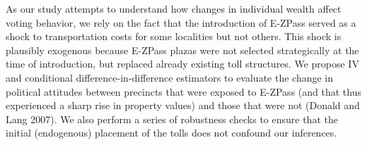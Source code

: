 As our study attempts to understand how changes in individual wealth affect voting behavior, we rely on the fact that the introduction of E-ZPass served as a shock to transportation costs for some localities but not others. This shock is plausibly exogenous because E-ZPass plazas were not selected strategically at the time of introduction, but replaced already existing toll structures. We propose IV and conditional difference-in-difference estimators to evaluate the change in political attitudes between precincts that were exposed to E-ZPass (and that thus experienced a sharp rise in property values) and those that were not (Donald and Lang 2007). We also perform a series of robustness checks to ensure that the initial (endogenous) placement of the tolls does not confound our inferences.